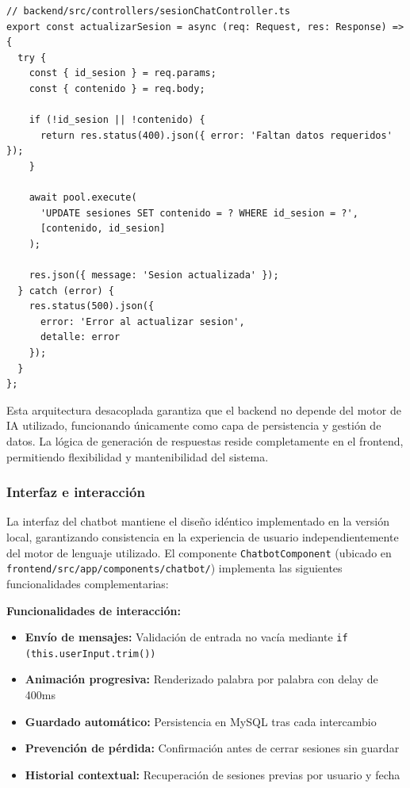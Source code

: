 \documentclass[12pt,a4paper]{report}
\numberwithin{figure}{section}
\begin{document}
\begin{lstlisting}[style=angelcode,caption={Controlador de actualizacion de sesiones}]
// backend/src/controllers/sesionChatController.ts
export const actualizarSesion = async (req: Request, res: Response) => {
  try {
    const { id_sesion } = req.params;
    const { contenido } = req.body;
    
    if (!id_sesion || !contenido) {
      return res.status(400).json({ error: 'Faltan datos requeridos' });
    }
    
    await pool.execute(
      'UPDATE sesiones SET contenido = ? WHERE id_sesion = ?',
      [contenido, id_sesion]
    );
    
    res.json({ message: 'Sesion actualizada' });
  } catch (error) {
    res.status(500).json({ 
      error: 'Error al actualizar sesion', 
      detalle: error 
    });
  }
};
\end{lstlisting}

Esta arquitectura desacoplada garantiza que el backend no depende del motor de IA utilizado, funcionando únicamente como capa de persistencia y gestión de datos. La lógica de generación de respuestas reside completamente en el frontend, permitiendo flexibilidad y mantenibilidad del sistema.

\vspace{1em}
\subsubsection{Interfaz e interacción}
\label{subsubsec:interfaz_interacción_openai}

La interfaz del chatbot mantiene el diseño idéntico implementado en la versión local, garantizando consistencia en la experiencia de usuario independientemente del motor de lenguaje utilizado. El componente \texttt{ChatbotComponent} (ubicado en \texttt{frontend/src/app/components/chatbot/}) implementa las siguientes funcionalidades complementarias:

\textbf{Funcionalidades de interacción:}
\begin{itemize}
  \item \textbf{Envío de mensajes:} Validación de entrada no vacía mediante \texttt{if (this.userInput.trim())}
  \item \textbf{Animación progresiva:} Renderizado palabra por palabra con delay de 400ms
  \item \textbf{Guardado automático:} Persistencia en MySQL tras cada intercambio
  \item \textbf{Prevención de pérdida:} Confirmación antes de cerrar sesiones sin guardar
  \item \textbf{Historial contextual:} Recuperación de sesiones previas por usuario y fecha
\end{itemize}
\end{document}
